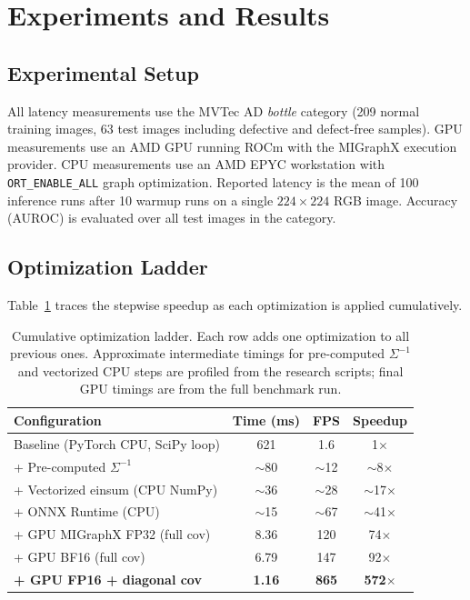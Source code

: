 \documentclass[blind]{gtac}
\begin{document}
\section{Experiments and Results}
\label{sec:experiments}

\subsection{Experimental Setup}

All latency measurements use the MVTec AD \emph{bottle} category (209 normal
training images, 63 test images including defective and defect-free samples).
GPU measurements use an AMD GPU running ROCm with the MIGraphX execution
provider.  CPU measurements use an AMD EPYC workstation with
\texttt{ORT\_ENABLE\_ALL} graph optimization.  Reported latency is the mean of
100 inference runs after 10 warmup runs on a single $224\!\times\!224$ RGB
image.  Accuracy (AUROC) is evaluated over all test images in the category.

\subsection{Optimization Ladder}

Table~\ref{tab:ladder} traces the stepwise speedup as each optimization is
applied cumulatively.

\begin{table}[H]
\centering
\caption{Cumulative optimization ladder.  Each row adds one optimization to all
previous ones.  Approximate intermediate timings for pre-computed $\Sigma^{-1}$
and vectorized CPU steps are profiled from the research scripts; final GPU
timings are from the full benchmark run.}
\label{tab:ladder}
\footnotesize
\begin{tabular}{@{}p{2.1in}ccc@{}}
\toprule
Configuration & Time (ms) & FPS & Speedup \\
\midrule
Baseline (PyTorch CPU, SciPy loop)      & 621   & 1.6  & 1$\times$        \\
+ Pre-computed $\Sigma^{-1}$            & $\sim$80  & $\sim$12  & $\sim$8$\times$  \\
+ Vectorized einsum (CPU NumPy)         & $\sim$36  & $\sim$28  & $\sim$17$\times$ \\
+ ONNX Runtime (CPU)                    & $\sim$15  & $\sim$67  & $\sim$41$\times$ \\
+ GPU MIGraphX FP32 (full cov)          & 8.36  & 120  & 74$\times$       \\
+ GPU BF16 (full cov)                   & 6.79  & 147  & 92$\times$       \\
\textbf{+ GPU FP16 + diagonal cov}      & \textbf{1.16}  & \textbf{865}  & \textbf{572$\times$} \\
\bottomrule
\end{tabular}
\end{table}
\end{document}
